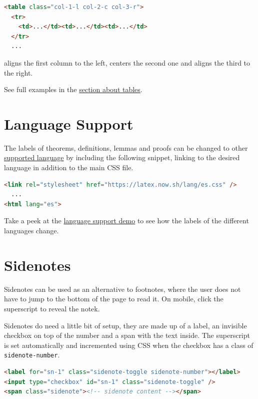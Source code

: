 \documentclass[
  11pt,
  a4paper,
]{article}
\begin{document}
\begin{lstlisting}[language=HTML]
<table class="col-1-l col-2-c col-3-r">
  <tr>
    <td>...</td><td>...</td><td>...</td>
  </tr>
  ...
\end{lstlisting}

aligns the first column to the left, centers the second one and aligns
the third to the right.

See full examples in the \hyperref[tables]{section about tables}.

\section{Language Support}\label{language-support}

The labels of theorems, definitions, lemmas and proofs can be changed to
other
\href{https://github.com/vincentdoerig/latex-css/tree/master/lang}{supported
language} by including the following snippet, linking to the desired
language in addition to the main CSS file.

\begin{lstlisting}[language=HTML]
<link rel="stylesheet" href="https://latex.now.sh/lang/es.css" />
  ...
<html lang="es">
\end{lstlisting}

Take a peek at the \href{/languages}{language support demo} to see how
the labels of the different languages change.

\section{Sidenotes}\label{sidenotes}

Sidenotes can be used as an alternative to footnotes, where the user
does not have to jump to the bottom of the page to read it. On mobile,
click the superscript to reveal the notek.

Sidenotes do need a little bit of setup, they are made up of a label, an
invisible checkbox on top of the number and a span with the text inside.
The superscript is set automatically and incremented using CSS when the
checkbox has a class of \lstinline!sidenote-number!.

\begin{lstlisting}[language=HTML]
<label for="sn-1" class="sidenote-toggle sidenote-number"></label>
<input type="checkbox" id="sn-1" class="sidenote-toggle" />
<span class="sidenote"><!-- sidenote content --></span>
\end{lstlisting}
\end{document}
